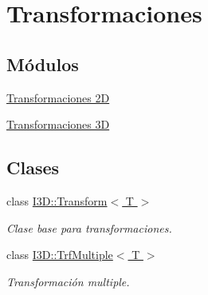 \hypertarget{group__trf_group}{}\section{Transformaciones}
\label{group__trf_group}
\subsection*{Módulos}
\begin{DoxyCompactItemize}
\item 
\hyperlink{group__trf2_d_group}{Transformaciones 2D}
\item 
\hyperlink{group__trf3_d_group}{Transformaciones 3D}
\end{DoxyCompactItemize}
\subsection*{Clases}
\begin{DoxyCompactItemize}
\item 
class \hyperlink{class_i3_d_1_1_transform}{I3\+D\+::\+Transform$<$ T $>$}
\begin{DoxyCompactList}\small\item\em Clase base para transformaciones. \end{DoxyCompactList}\item 
class \hyperlink{class_i3_d_1_1_trf_multiple}{I3\+D\+::\+Trf\+Multiple$<$ T $>$}
\begin{DoxyCompactList}\small\item\em Transformación multiple. \end{DoxyCompactList}\end{DoxyCompactItemize}
